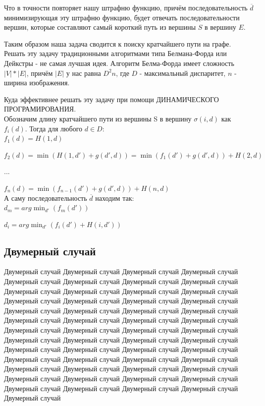 	Что в точности повторяет нашу штрафню функцию, причём последовательность $\overline{d}$ минимизирующая эту штрафню функцию, будет отвечать последовательности вершин, которые составляют самый короткий путь из вершины $S$ в вершину $E$.
	
	Таким образом наша задача сводится к поиску кратчайшего пути на графе.\\
	
	Решать эту задачу традиционными алгоритмами типа Белмана-Форда или Дейкстры - не самая лучшая идея. Алгоритм Белма-Форда имеет сложность $|V| * |E|$, причём $|E|$ у нас равна $D^2 n$, где $D$ - максимальный диспаритет, $n$ - ширина изображения.
	
	Куда эффективнее решать эту задачу при помощи ДИНАМИЧЕСКОГО ПРОГРАМИРОВАНИЯ. \\
	
	Обозначим длину кратчайшего пути из вершины S в вершину $\sigma(i, d)$ как $f_i(d)$. 
	Тогда для любого $d \in D$:\\
	
		$f_1(d) = H(1, d)$
		
		$f_2(d) = \min(H(1,d') + g(d', d)) = \min(f_1(d') + g(d', d)) + H(2,d)$
		
	 	...
	 	
	 	$f_n(d) = \min(f_{n-1}(d') + g(d', d)) + H(n,d)$\\

	А саму последовательность $\overline{d}$ находим так:\\
	
		$d_m = arg\min_{d'} (f_m(d'))$
		
		$d_i = arg\min_{d'} (f_i(d') + H(i,d'))$
	
\subsection{Двумерный случай}	
	Двумерный случай Двумерный случай Двумерный случай Двумерный случай Двумерный случай Двумерный случай Двумерный случай Двумерный случай Двумерный случай Двумерный случай Двумерный случай Двумерный случай Двумерный случай Двумерный случай Двумерный случай Двумерный случай Двумерный случай Двумерный случай Двумерный случай Двумерный случай Двумерный случай Двумерный случай Двумерный случай Двумерный случай Двумерный случай Двумерный случай Двумерный случай Двумерный случай Двумерный случай Двумерный случай Двумерный случай Двумерный случай Двумерный случай Двумерный случай Двумерный случай Двумерный случай Двумерный случай Двумерный случай Двумерный случай Двумерный случай Двумерный случай Двумерный случай Двумерный случай Двумерный случай Двумерный случай Двумерный случай Двумерный случай Двумерный случай Двумерный случай Двумерный случай Двумерный случай Двумерный случай Двумерный случай 
	
